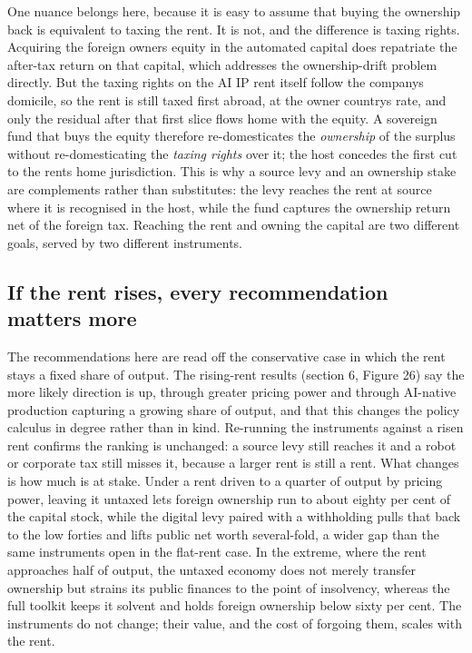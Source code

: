 \documentclass[11pt]{article}
\begin{document}
One nuance belongs here, because it is easy to assume that buying the
ownership back is equivalent to taxing the rent. It is not, and the
difference is taxing rights. Acquiring the foreign owner\textquotesingle s
equity in the automated capital does repatriate the after-tax return on
that capital, which addresses the ownership-drift problem directly. But
the taxing rights on the AI IP rent itself follow the company\textquotesingle s
domicile, so the rent is still taxed first abroad, at the owner
country\textquotesingle s rate, and only the residual after that first
slice flows home with the equity. A sovereign fund that buys the equity
therefore re-domesticates the \emph{ownership} of the surplus without
re-domesticating the \emph{taxing rights} over it; the host concedes the
first cut to the rent\textquotesingle s home jurisdiction. This is why a
source levy and an ownership stake are complements rather than
substitutes: the levy reaches the rent at source where it is recognised
in the host, while the fund captures the ownership return net of the
foreign tax. Reaching the rent and owning the capital are two different
goals, served by two different instruments.

\hypertarget{if-the-rent-rises-every-recommendation-matters-more}{%
\subsection{If the rent rises, every recommendation matters
more}\label{if-the-rent-rises-every-recommendation-matters-more}}

The recommendations here are read off the conservative case in which the
rent stays a fixed share of output. The rising-rent results (section 6,
Figure 26) say the more likely direction is up, through greater pricing
power and through AI-native production capturing a growing share of
output, and that this changes the policy calculus in degree rather than
in kind. Re-running the instruments against a risen rent confirms the
ranking is unchanged: a source levy still reaches it and a robot or
corporate tax still misses it, because a larger rent is still a rent.
What changes is how much is at stake. Under a rent driven to a quarter
of output by pricing power, leaving it untaxed lets foreign ownership
run to about eighty per cent of the capital stock, while the digital
levy paired with a withholding pulls that back to the low forties and
lifts public net worth several-fold, a wider gap than the same
instruments open in the flat-rent case. In the extreme, where the rent
approaches half of output, the untaxed economy does not merely transfer
ownership but strains its public finances to the point of insolvency,
whereas the full toolkit keeps it solvent and holds foreign ownership
below sixty per cent. The instruments do not change; their value, and
the cost of forgoing them, scales with the rent.
\end{document}
